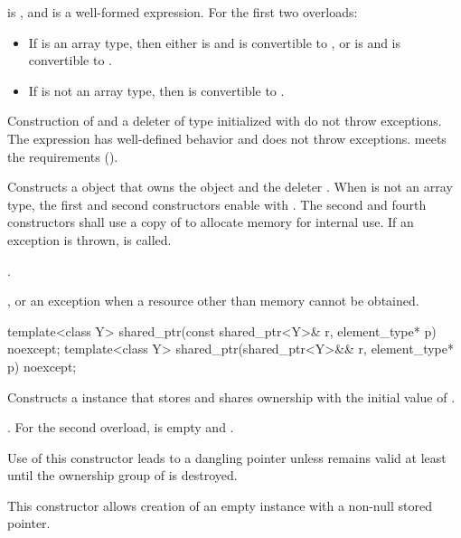 \begin{itemdescr}
\pnum
\constraints
{} is , and
 is a well-formed expression.
For the first two overloads:

\begin{itemize}
\item
If  is an array type, then either
 is  and  is convertible to , or
 is  and  is convertible to .

\item
If  is not an array type, then  is convertible to .
\end{itemize}

\pnum
\expects
Construction of  and a deleter of type 
initialized with  do not throw exceptions.
The expression 
has well-defined behavior and does not throw exceptions.
 meets the  requirements ().

\pnum
\effects
Constructs a  object that owns the
object  and the deleter .
When  is not an array type,
the first and second constructors enable  with .
The second and fourth constructors shall use a copy of  to
allocate memory for internal use.
If an exception is thrown,  is called.

\pnum
\ensures
{}.

\pnum
\throws
{}, or an  exception
when a resource other than memory cannot be obtained.
\end{itemdescr}

%
\begin{itemdecl}
template<class Y> shared_ptr(const shared_ptr<Y>& r, element_type* p) noexcept;
template<class Y> shared_ptr(shared_ptr<Y>&& r, element_type* p) noexcept;
\end{itemdecl}

\begin{itemdescr}
\pnum
\effects
Constructs a  instance that
stores  and shares ownership with
the initial value of .

\pnum
\ensures
{}.
For the second overload,
 is empty and .

\pnum
\begin{note}
Use of this constructor leads to a dangling pointer
unless  remains valid
at least until the ownership group of  is destroyed.
\end{note}

\pnum
\begin{note}
This constructor allows creation of an empty
 instance with a non-null stored pointer.
\end{note}
\end{itemdescr}

